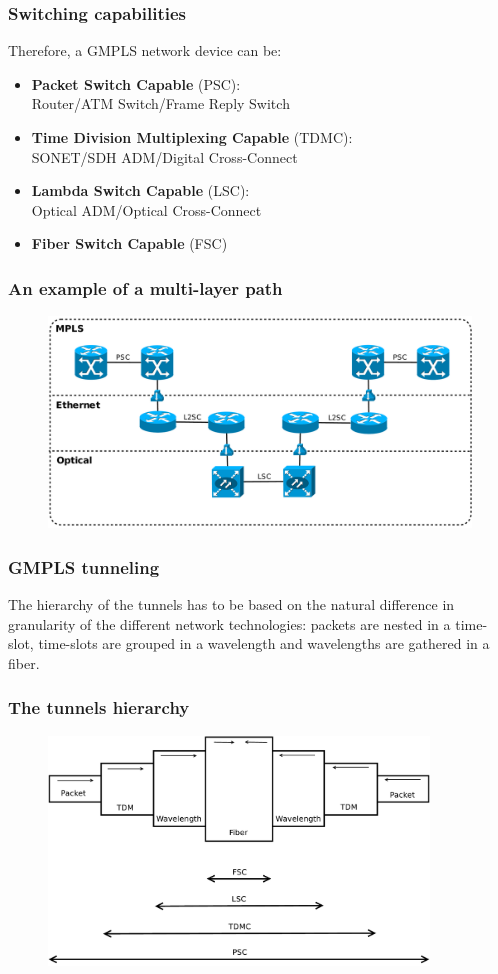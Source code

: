 \documentclass{beamer}
\begin{document}
\frame
{
  \frametitle{Switching capabilities}

  Therefore, a GMPLS network device can be:
  \begin{itemize}
    \item \textbf{Packet Switch Capable} (PSC):\\
      Router/ATM Switch/Frame Reply Switch
    \item \textbf{Time Division Multiplexing Capable} (TDMC):\\
      SONET/SDH ADM/Digital Cross-Connect
    \item \textbf{Lambda Switch Capable} (LSC):\\
      Optical ADM/Optical Cross-Connect
    \item \textbf{Fiber Switch Capable} (FSC)
  \end{itemize}
}
\frame
{
  \frametitle{An example of a multi-layer path}

  \begin{figure}[!htbp]
    \begin{center}
      \includegraphics[width=1\textwidth]{img/multi_path}
    \end{center}
  \end{figure}
}
\frame
{
  \frametitle{GMPLS tunneling}
  
  The hierarchy of the tunnels has to be based on the natural
  difference in granularity of the different network technologies:
  packets are nested in a time-slot, time-slots are grouped in a
  wavelength and wavelengths are gathered in a fiber.

}
\frame
{
  \frametitle{The tunnels hierarchy}

  \begin{figure}[!htbp]
    \centering
    \includegraphics[width=0.9\textwidth]{img/gmpls_hierarchy}
  \end{figure}
}
\end{document}
